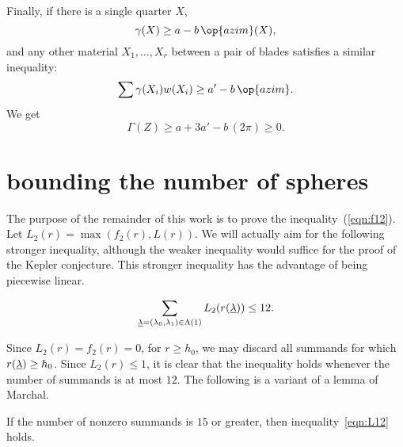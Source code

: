 Finally, if there is a single quarter $X$, 
$$
\gamma(X) \ge a - b\, \op{azim}(X),
$$
and any other material $X_1,\ldots,X_r$
between a pair of blades
satisfies a similar inequality:
$$
\sum \gamma(X_i)w(X_i) \ge a' - b\,\op{azim}.
$$
We get
$$
\Gamma(Z) \ge  a + 3 a' - b\, (2\pi) \ge 0.
$$

\section{bounding the number of spheres}

The purpose of the remainder of this work is to prove the inequality~(\ref{eqn:f12}).   Let $L_2(r) = \max(f_2(r),L(r))$.  We will actually aim for the 
following stronger
inequality, although the weaker inequality would suffice for the proof of the Kepler conjecture.  This stronger inequality has the advantage of being piecewise linear.

\begin{conjecture}
\begin{equation}\label{eqn:L12}
\sum_{{\underline{\lambda}}=(\lambda_0,\lambda_1)\in\Lambda(1)} L_2(r({\underline{\lambda}})) \le 12.
\end{equation}
\end{conjecture}
Since $L_2(r) = f_2(r) = 0$, for $r\ge h_0$, we may discard all summands for which $r({\underline{\lambda}})\ge h_0$.  Since $L_2(r)\le 1$, it is clear that the inequality holds whenever the number of summands is at most $12$. The following is a variant of a lemma of Marchal.


\begin{lemma}  If the number of nonzero summands is $15$ or greater, then inequality~\ref{eqn:L12} holds.
\end{lemma}

